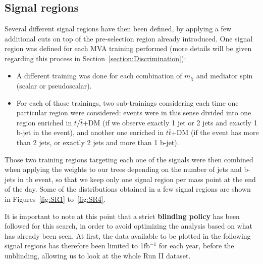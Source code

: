 \documentclass[a4paper, 10pt, openright]{report}
\begin{document}
\subsection{Signal regions} \label{section:SR}

Several different signal regions have then been defined, by applying a few additional cuts on top of the pre-selection region already introduced. One signal region was defined for each \ac{MVA} training performed (more details will be given regarding this process in Section~\ref{section:Discrimination}):
\begin{itemize}
\item A different training was done for each combination of $m_\chi$ and mediator spin (scalar or pseudoscalar).
\item For each of those trainings, two sub-trainings considering each time one particular region were considered: events were in this sense divided into one region enriched in $t/\bar t$+DM (if we observe exactly 1 jet or 2 jets and exactly 1 b-jet in the event), and another one enriched in $t \bar t$+DM (if the event has more than 2 jets, or exactly 2 jets and more than 1 b-jet).
\end{itemize}

Those two training regions targeting each one of the signals were then combined when applying the weights to our trees depending on the number of jets and b-jets in th event, so that we keep only one signal region per mass point at the end of the day. Some of the distributions obtained in a few signal regions are shown in Figures~\ref{fig:SR1} to~\ref{fig:SR4}.

It is important to note at this point that a strict \textbf{blinding policy} has been followed for this search, in order to avoid optimizing the analysis based on what has already been seen. At first, the data available to be plotted in the following signal regions has therefore been limited to 1fb$^{-1}$ for each year, before the unblinding, allowing us to look at the whole Run II dataset. %

\end{document}
